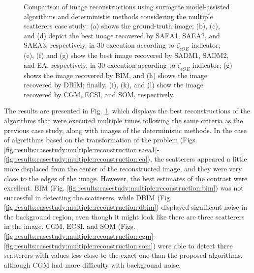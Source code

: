 \begin{figure}[!h]
				\caption[Multiple scatterers case study: Comparison of image reconstructions using surrogate model-assisted algorithms and deterministic methods.]{Comparison of image reconstructions using surrogate model-assisted algorithms and deterministic methods considering the multiple scatterers case study: (a) shows the ground-truth image; (b), (c), and (d) depict the best image recovered by SAEA1, SAEA2, and SAEA3, respectively, in 30 execution according to $\zeta_{\epsilon OE}$ indicator; (e), (f) and (g) show the best image recovered by SADM1, SADM2, and EA, respectively, in 30 execution according to $\zeta_{\epsilon OE}$ indicator; (g) shows the image recovered by BIM, and (h) shows the image recovered by DBIM; finally, (i), (k), and (l) show the image recovered by CGM, ECSI, and SOM, respectively.}
				\label{fig:results:casestudy:multiple:reconstruction}
			\end{figure}
		
			
			The results are presented in Fig. \ref{fig:results:casestudy:multiple:reconstruction}, which displays the best reconstructions of the algorithms that were executed multiple times following the same criteria as the previous case study, along with images of the deterministic methods. In the case of algorithms based on the transformation of the problem (Figs. \ref{fig:results:casestudy:multiple:reconstruction:saea1}-\ref{fig:results:casestudy:multiple:reconstruction:ea}), the scatterers appeared a little more displaced from the center of the reconstructed image, and they were very close to the edges of the image. However, the best estimates of the contrast were excellent. BIM (Fig. \ref{fig:results:casestudy:multiple:reconstruction:bim}) was not successful in detecting the scatterers, while DBIM (Fig. \ref{fig:results:casestudy:multiple:reconstruction:dbim}) displayed significant noise in the background region, even though it might look like there are three scatterers in the image. CGM, ECSI, and SOM (Figs. \ref{fig:results:casestudy:multiple:reconstruction:cgm}-\ref{fig:results:casestudy:multiple:reconstruction:som}) were able to detect three scatterers with values less close to the exact one than the proposed algorithms, although CGM had more difficulty with background noise.
		
